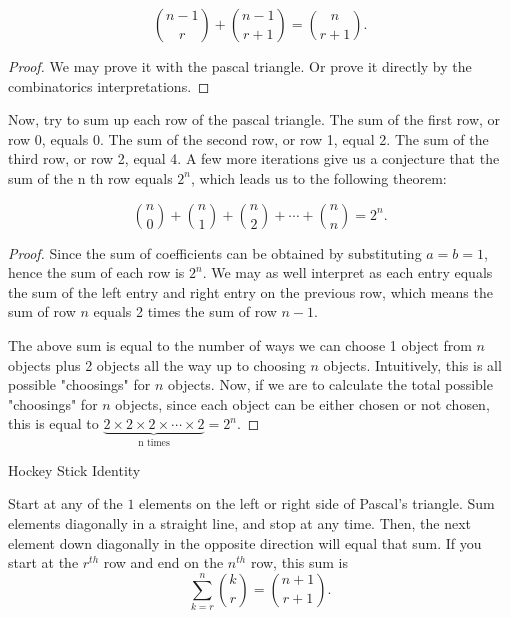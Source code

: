 
\begin{mysubsection}{}
    \begin{theorem}[thm:]{}
        \[{n-1\choose r}+{n-1\choose r+1}={n\choose r+1}.\]
    \end{theorem}

    \begin{proof}
        We may prove it with the pascal triangle. Or prove it directly by the combinatorics interpretations.
    \end{proof}

    Now, try to sum up each row of the pascal triangle. The sum of the first row, or row 0, equals 0. The sum of the second row, or row 1, equal 2. The sum of the third row, or row 2, equal 4. A few more iterations give us a conjecture that the sum of the n th row equals $2^n$, which leads us to the following theorem:

    \begin{theorem}[thm:]{}
        \[{n\choose 0}+{n\choose 1}+{n\choose 2}+\cdots +{n\choose n}=2^n.\]
    \end{theorem}

    \begin{proof}
        Since the sum of coefficients can be obtained by substituting $a=b=1$, hence the sum of each row is $2^n$. We may as well interpret as each entry equals the sum of the left entry and right entry on the previous row, which means the sum of row $n$ equals 2 times the sum of row $n-1$.

        The above sum is equal to the number of ways we can choose 1 object from $n$ objects plus 2 objects all the way up to choosing $n$ objects. Intuitively, this is all possible "choosings" for $n$ objects. Now, if we are to calculate the total possible "choosings" for $n$ objects, since each object can be either chosen or not chosen, this is equal to $\underbrace{2\times 2\times 2\times \cdots \times 2}_{\text{n times}}=2^n.$
    \end{proof}

    \begin{theorem}[thm:]{Hockey Stick Identity}
        \noindent\begin{minipage}{.65\linewidth}
        Start at any of the $1$ elements on the left or right side of Pascal's triangle. Sum elements diagonally in a straight line, and stop at any time. Then, the next element down diagonally in the opposite direction will equal that sum.
        If you start at the $r^{th}$ row and end on the $n^{th}$ row, this sum is
        \[\sum_{k=r}^{n}{k\choose r}={n+1\choose r+1}.\]
        \end{minipage}
        \begin{minipage}{.3\linewidth}
            

\end{minipage}
\end{theorem}
\end{mysubsection}
